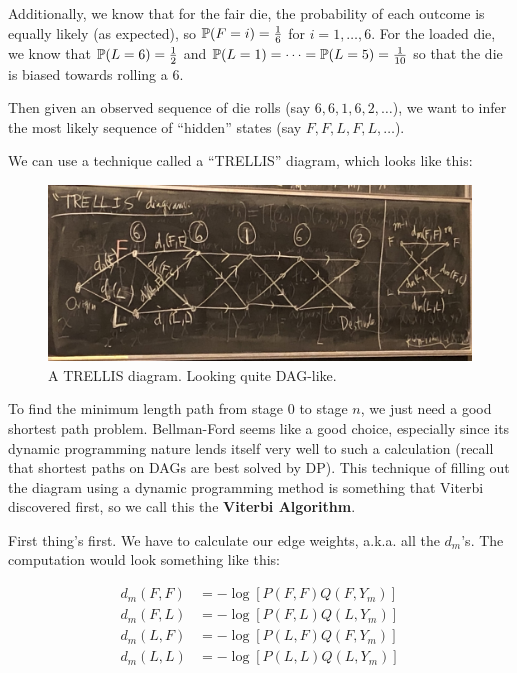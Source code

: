 \documentclass[11 pt]{scrartcl}
\begin{document}
Additionally, we know that for the fair die, the probability of each outcome is equally likely (as expected), so $\mathbb P(F = i) = \frac{1}{6}$ for $i = 1, \dots, 6$. For the loaded die, we know that $\mathbb P(L = 6) = \frac{1}{2}$ and $\mathbb P(L = 1) = \dots = \mathbb P(L = 5) = \frac{1}{10}$ so that the die is biased towards rolling a 6. 


Then given an observed sequence of die rolls (say $6, 6, 1, 6, 2, \dots$), we want to infer the most likely sequence of ``hidden'' states (say $F, F, L, F, L, \dots$). 

We can use a technique called a ``TRELLIS'' diagram, which looks like this: 

\begin{figure}[!htb]
    \centering 
    \includegraphics[scale=0.13]{trellis.jpg}
    \caption{A TRELLIS diagram. Looking quite DAG-like.}
\end{figure}

To find the minimum length path from stage $0$ to stage $n$, we just need a good shortest path problem. Bellman-Ford seems like a good choice, especially since its dynamic programming nature lends itself very well to such a calculation (recall that shortest paths on DAGs are best solved by DP). This technique of filling out the diagram using a dynamic programming method is something that Viterbi discovered first, so we call this the \textbf{Viterbi Algorithm}.

First thing's first. We have to calculate our edge weights, a.k.a. all the $d_m$'s. The computation would look something like this: 

\begin{align*}
    d_m(F, F) &= -\log \left[ P(F,F) Q(F, Y_{m})\right] \\ 
    d_m(F, L) &= -\log \left[ P(F,L) Q(L, Y_{m})\right] \\ 
    d_m(L, F) &= -\log \left[ P(L,F) Q(F, Y_{m})\right] \\ 
    d_m(L, L) &= -\log \left[ P(L,L) Q(L, Y_{m})\right] 
\end{align*}
\end{document}
